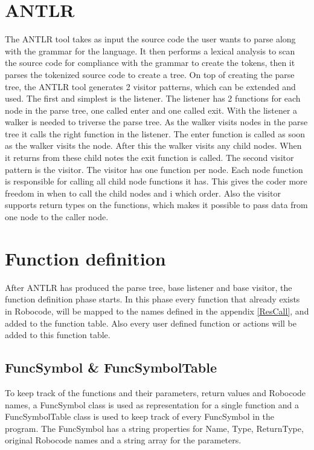\section{ANTLR}
The ANTLR tool takes as input the source code the user wants to parse along with the grammar for the language. It then performs a lexical analysis to scan the source code for compliance with the grammar to create the tokens, then it parses the tokenized source code to create a  tree. On top of creating the parse tree, the ANTLR tool generates 2 visitor patterns, which can be extended and used. The first and simplest is the listener. The listener has 2 functions for each node in the parse tree, one called enter and one called exit. With the listener a walker is needed to triverse the parse tree. As the walker visits nodes in the parse tree it calls the right function in the listener. The enter function is called as soon as the walker visits the node. After this the walker visits any child nodes. When it returns from these child notes the exit function is called. The second visitor pattern is the visitor. The visitor has one function per node. Each node function is responsible for calling all child node functions it has. This gives the coder more freedom in when to call the child nodes and i which order. Also the visitor supports return types on the functions, which makes it possible to pass data from one node to the caller node. 


\section{Function definition}
After ANTLR has produced the parse tree, base listener and base visitor, the function definition phase starts. In this phase every function that already exists in Robocode, will be mapped to the names defined in the appendix \ref{ResCall}, and added to the function table. Also every user defined function or actions will be added to this function table. 

\subsection{FuncSymbol \& FuncSymbolTable}
To keep track of the functions and their parameters, return values and Robocode names, a FuncSymbol class is used as representation for a single function and a FuncSymbolTable class is used to keep track of every FuncSymbol in the program.
The FuncSymbol has a string properties for Name, Type, ReturnType, original Robocode names and a string array for the parameters.

